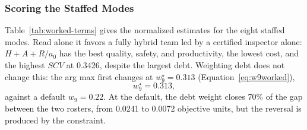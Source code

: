\documentclass[utf8]{FrontiersinHarvard}
\begin{document}
	\subsubsection*{Scoring the Staffed Modes}
	\label{sec:pricing}

	Table~\ref{tab:worked-terms} gives the normalized estimates for the eight staffed modes. Read alone it favors a fully hybrid team led by a certified inspector alone: $H{+}A{+}R/a_0$ has the best quality, safety, and productivity, the lowest cost, and the highest $SCV$ at 0.3426, despite the largest debt. Weighting debt does not change this: the arg max first changes at $w_9^\star=0.313$ (Equation~\eqref{eq:w9worked}),
	\begin{equation}
		w_9^\star = 0.313,
		\label{eq:w9worked}
	\end{equation}
	against a default $w_9=0.22$. At the default, the debt weight closes 70\% of the gap between the two rosters, from 0.0241 to 0.0072 objective units, but the reversal is produced by the constraint.
\end{document}

